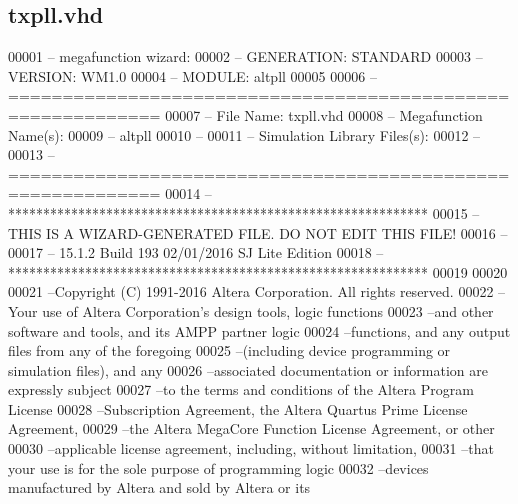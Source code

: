 \subsection{txpll.\+vhd}
\label{txpll_8vhd_source}

\begin{DoxyCode}
00001 \textcolor{keyword}{-- megafunction wizard: %
00002 \textcolor{keyword}{-- GENERATION: STANDARD}
00003 \textcolor{keyword}{-- VERSION: WM1.0}
00004 \textcolor{keyword}{-- MODULE: altpll }
00005 
00006 \textcolor{keyword}{-- ============================================================}
00007 \textcolor{keyword}{-- File Name: txpll.vhd}
00008 \textcolor{keyword}{-- Megafunction Name(s):}
00009 \textcolor{keyword}{--          altpll}
00010 \textcolor{keyword}{--}
00011 \textcolor{keyword}{-- Simulation Library Files(s):}
00012 \textcolor{keyword}{--          }
00013 \textcolor{keyword}{-- ============================================================}
00014 \textcolor{keyword}{-- ************************************************************}
00015 \textcolor{keyword}{-- THIS IS A WIZARD-GENERATED FILE. DO NOT EDIT THIS FILE!}
00016 \textcolor{keyword}{--}
00017 \textcolor{keyword}{-- 15.1.2 Build 193 02/01/2016 SJ Lite Edition}
00018 \textcolor{keyword}{-- ************************************************************}
00019 
00020 
00021 \textcolor{keyword}{--Copyright (C) 1991-2016 Altera Corporation. All rights reserved.}
00022 \textcolor{keyword}{--Your use of Altera Corporation's design tools, logic functions }
00023 \textcolor{keyword}{--and other software and tools, and its AMPP partner logic }
00024 \textcolor{keyword}{--functions, and any output files from any of the foregoing }
00025 \textcolor{keyword}{--(including device programming or simulation files), and any }
00026 \textcolor{keyword}{--associated documentation or information are expressly subject }
00027 \textcolor{keyword}{--to the terms and conditions of the Altera Program License }
00028 \textcolor{keyword}{--Subscription Agreement, the Altera Quartus Prime License Agreement,}
00029 \textcolor{keyword}{--the Altera MegaCore Function License Agreement, or other }
00030 \textcolor{keyword}{--applicable license agreement, including, without limitation, }
00031 \textcolor{keyword}{--that your use is for the sole purpose of programming logic }
00032 \textcolor{keyword}{--devices manufactured by Altera and sold by Altera or its }
}
\end{DoxyCode}
